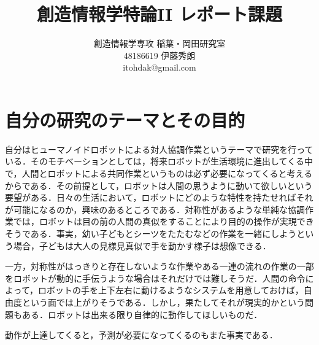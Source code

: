 \documentclass[onecolumn]{preport}
\title{創造情報学特論II レポート課題}
\author{創造情報学専攻 稲葉・岡田研究室\\
  48186619 伊藤秀朗\\
  itohdak@gmail.com}
\begin{document}
\pagestyle{empty}
\maketitle
\thispagestyle{empty}
\sloppy


\section{自分の研究のテーマとその目的}
自分はヒューマノイドロボットによる対人協調作業というテーマで研究を行っている．そのモチベーションとしては，将来ロボットが生活環境に進出してくる中で，人間とロボットによる共同作業というものは必ず必要になってくると考えるからである．その前提として，ロボットは人間の思うように動いて欲しいという要望がある．日々の生活において，ロボットにどのような特性を持たせればそれが可能になるのか，興味のあるところである．対称性があるような単純な協調作業では，ロボットは目の前の人間の真似をすることにより目的の操作が実現できそうである．事実，幼い子どもとシーツをたたむなどの作業を一緒にしようという場合，子どもは大人の見様見真似で手を動かす様子は想像できる．\par
一方，対称性がはっきりと存在しないような作業やある一連の流れの作業の一部をロボットが動的に手伝うような場合はそれだけでは難しそうだ．人間の命令によって，ロボットの手を上下左右に動けるようなシステムを用意しておけば，自由度という面では上がりそうである．しかし，果たしてそれが現実的かという問題もある．ロボットは出来る限り自律的に動作してほしいものだ．\par
動作が上達してくると，予測が必要になってくるのもまた事実である．
\end{document}
